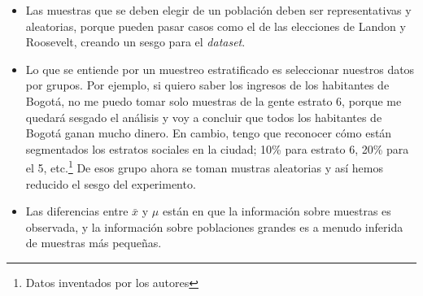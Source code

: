 \documentclass[12pt]{article}\usepackage[]{graphicx}\usepackage[]{xcolor}
\begin{document}
\begin{itemize}
  \item Las muestras que se deben elegir de un población deben ser representativas y aleatorias, porque pueden pasar casos como el de las elecciones de Landon y Roosevelt, creando un sesgo para el \textit{dataset}.
  \item Lo que se entiende por un muestreo estratificado es seleccionar nuestros datos por grupos. Por ejemplo, si quiero saber los ingresos de los habitantes de Bogotá, no me puedo tomar solo muestras de la gente estrato 6, porque me quedará sesgado el análisis y voy a concluir que todos los habitantes de Bogotá ganan mucho dinero. En cambio, tengo que reconocer cómo están segmentados los estratos sociales en la ciudad; 10\% para estrato 6, 20\% para el 5, etc.\footnote{Datos inventados por los autores} De esos grupo ahora se toman mustras aleatorias y así hemos reducido el sesgo del experimento.
  \item Las diferencias entre $\bar{x}$ y $\mu$ están en que la información sobre muestras es observada, y la información sobre poblaciones grandes es a menudo inferida de muestras más pequeñas.
\end{itemize}

\printbibliography
\end{document}
